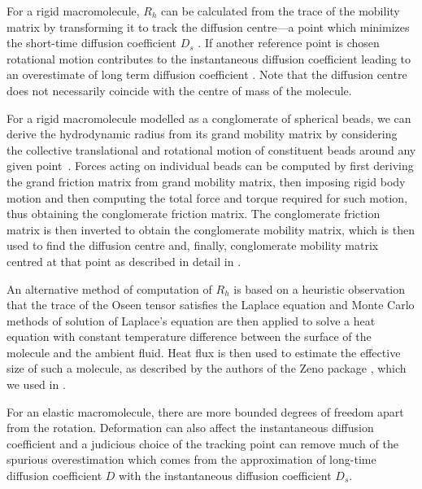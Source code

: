 \documentclass{doctoral}
\begin{document}
For a rigid macromolecule, $R_h$ can be calculated from the trace of the mobility matrix by transforming it to track the diffusion centre---a point which minimizes the short-time diffusion coefficient $D_{s}$ \cite{Zuk_2018}.
If another reference point is chosen rotational motion contributes to the instantaneous diffusion coefficient leading to an overestimate of long term diffusion coefficient \cite{Cichocki_2015}.
Note that the diffusion centre does not necessarily coincide with the centre of mass of the molecule.

For a rigid macromolecule modelled as a conglomerate of spherical beads, we can derive the hydrodynamic radius from its grand mobility matrix by considering the collective translational and rotational motion of constituent beads around any given point~\cite{Ekiel-Jezewska_2009}.
Forces acting on individual beads can be computed by first deriving the grand friction matrix from grand mobility matrix, then imposing rigid body motion and then computing the total force and torque required for such motion, thus obtaining the conglomerate friction matrix.
The conglomerate friction matrix is then inverted to obtain the conglomerate mobility matrix, which is then used to find the diffusion centre and, finally,  conglomerate mobility matrix centred at that point as described in detail in \textcite{Cichocki_2019}.

An alternative method of computation of $R_h$ is based on a heuristic observation that the trace of the Oseen tensor satisfies the Laplace equation and Monte Carlo methods of solution of Laplace's equation are then applied to solve a heat equation with constant temperature difference between the surface of the molecule and the ambient fluid.
Heat flux is then used to estimate the effective size of such a molecule, as described by the authors of the Zeno package \cite{Juba_2017}, which we used in \textcite{Waszkiewicz_2023_dna}.

For an elastic macromolecule, there are more bounded degrees of freedom apart from the rotation.
Deformation can also affect the instantaneous diffusion coefficient and a judicious choice of the tracking point can remove much of the spurious overestimation which comes from the approximation of long-time diffusion coefficient $D$ with the instantaneous diffusion coefficient $D_{s}$.
\end{document}
